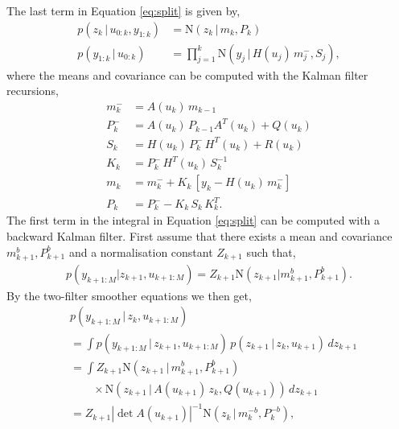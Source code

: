 \documentclass[twocolumn]{autart}    %
\begin{document}
The last term in Equation \eqref{eq:split} is given by,
%
\begin{equation}
\begin{split}
  p(z_k \,|\, u_{0:k}, y_{1:k})
  &= \mathrm{N}(z_k\,|\,m_k,P_k) \\
  p(y_{1:k}\,|\,u_{0:k})
  &= \prod_{j=1}^k \mathrm{N}(y_j\,|\,H(u_j) \, m^-_j,S_j),
\end{split}
\end{equation}
%
where the means and covariance can be computed with the Kalman filter recursions,
%
\begin{equation}
\begin{split}
 m^-_k &= A(u_{k}) \, m_{k-1} \\
 P^-_k &= A(u_{k}) \, P_{k-1} A^T(u_{k}) + Q(u_{k}) \\
   S_k &= H(u_{k}) \, P^-_k \, H^T(u_{k}) + R(u_{k}) \\
   K_k &= P^-_k \, H^T(u_{k}) \, S_k^{-1} \\
   m_k &= m^-_k + K_k \, [y_k - H(u_{k}) \, m^-_k] \\
   P_k &= P^-_k - K_k \, S_k \, K_k^T.
\end{split}
\end{equation}
%
The first term in the integral in Equation \eqref{eq:split} can be computed with a backward Kalman filter. First assume that there exists a mean and covariance $m^{b}_{k+1},P^{b}_{k+1}$ and a normalisation constant $Z_{k+1}$ such that,
%
\begin{equation}
\begin{split}
  p(y_{k+1:M} | z_{k+1},u_{k+1:M})
  = Z_{k+1} \mathrm{N}(z_{k+1} | m^{b}_{k+1}, P^{b}_{k+1})     .
\end{split}
\label{eq:normconst}
\end{equation}
%
By the two-filter smoother equations we then get,
%
\begin{equation}
\begin{split}
  &p(y_{k+1:M} \,|\, z_{k},u_{k+1:M}) \\
  &=
  \int
  p(y_{k+1:M} \,|\, z_{k+1},u_{k+1:M}) \,
  p(z_{k+1} \,|\, z_{k},u_{k+1}) \, dz_{k+1} \\
  &= \int
  Z_{k+1} \mathrm{N}(z_{k+1} \,|\, m^{b}_{k+1}, P^{b}_{k+1}) \\
  &\qquad \times \mathrm{N}(z_{k+1} \,|\,A(u_{k+1}) \, z_k, Q(u_{k+1})) \, dz_{k+1} \\
  &=
  Z_{k+1} |\det A(u_{k+1})|^{-1}
  \mathrm{N}(z_{k} \,|\, m^{-b}_{k}, P^{-b}_{k}),
\end{split}
\end{equation}
\end{document}
